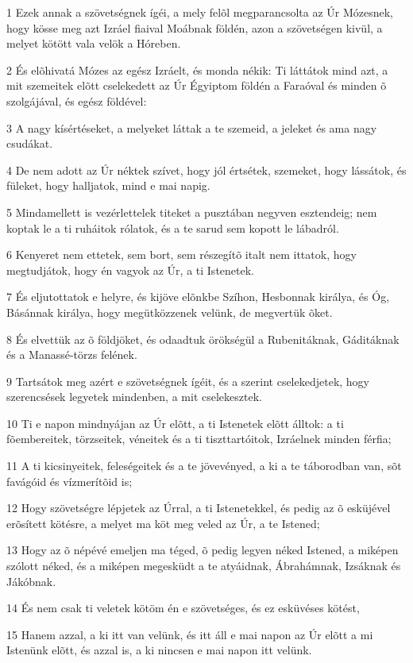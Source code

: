 \par 1 Ezek annak a szövetségnek ígéi, a mely felõl megparancsolta az Úr Mózesnek, hogy kösse meg azt Izráel fiaival Moábnak földén, azon a szövetségen kivül, a melyet kötött vala velök a Hóreben.
\par 2 És elõhivatá Mózes az egész Izráelt, és monda nékik: Ti láttátok mind azt, a mit szemeitek elõtt cselekedett az Úr Égyiptom földén a Faraóval és minden õ szolgájával, és egész földével:
\par 3 A nagy kísértéseket, a melyeket láttak a te szemeid, a jeleket és ama nagy  csudákat.
\par 4 De nem adott az Úr néktek szívet, hogy jól értsétek, szemeket, hogy lássátok, és füleket, hogy halljatok, mind e mai napig.
\par 5 Mindamellett is vezérlettelek titeket a pusztában negyven esztendeig; nem koptak le a ti ruháitok rólatok, és a te sarud sem kopott le lábadról.
\par 6 Kenyeret nem ettetek, sem bort, sem részegítõ italt nem ittatok, hogy megtudjátok, hogy én vagyok az Úr, a ti Istenetek.
\par 7 És eljutottatok e helyre, és kijöve elõnkbe Szíhon, Hesbonnak királya, és Óg, Básánnak királya, hogy megütközzenek velünk, de megvertük õket.
\par 8 És elvettük az õ földjöket, és odaadtuk örökségül a Rubenitáknak, Gáditáknak és a Manassé-törzs felének.
\par 9 Tartsátok meg azért e szövetségnek ígéit, és a szerint cselekedjetek, hogy szerencsések legyetek mindenben, a mit cselekesztek.
\par 10 Ti e napon mindnyájan az Úr elõtt, a ti Istenetek elõtt álltok: a ti fõembereitek, törzseitek, véneitek és a ti tiszttartóitok, Izráelnek minden férfia;
\par 11 A ti kicsinyeitek, feleségeitek és a te jövevényed, a ki a te táborodban van, sõt favágóid és vízmerítõid is;
\par 12 Hogy szövetségre lépjetek az Úrral, a ti Istenetekkel, és pedig az õ esküjével erõsített kötésre, a melyet ma köt meg veled az Úr, a te Istened;
\par 13 Hogy az õ népévé emeljen ma téged, õ pedig legyen néked Istened, a miképen szólott néked, és a miképen megesküdt  a te atyáidnak, Ábrahámnak, Izsáknak és Jákóbnak.
\par 14 És nem csak ti veletek kötöm én e szövetséges, és ez esküvéses kötést,
\par 15 Hanem azzal, a ki itt van velünk, és itt áll e mai napon az Úr elõtt a mi Istenünk elõtt, és azzal is, a ki nincsen e mai napon itt velünk.
